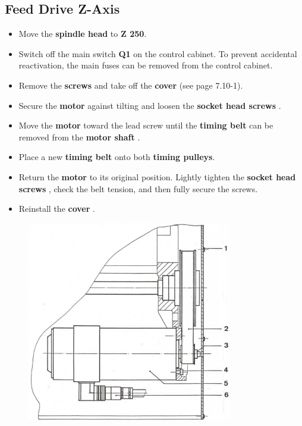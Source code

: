 
\newpage
\subsection*{Feed Drive Z-Axis}

\begin{itemize}
    \item Move the \textbf{spindle head} to \textbf{Z 250}.
    \item Switch off the main switch \textbf{Q1} on the control cabinet.  
          To prevent accidental reactivation, the main fuses can be removed from the control cabinet.
    \item Remove the \textbf{screws } and take off the \textbf{cover } (see page 7.10-1).
    \item Secure the \textbf{motor } against tilting and loosen the \textbf{socket head screws }.
    \item Move the \textbf{motor } toward the lead screw until the \textbf{timing belt } can be removed from the \textbf{motor shaft }.
    \item Place a new \textbf{timing belt } onto both \textbf{timing pulleys}.
    \item Return the \textbf{motor } to its original position. Lightly tighten the \textbf{socket head screws }, check the belt tension, and then fully secure the screws.
    \item Reinstall the \textbf{cover }.
\end{itemize}

\begin{figure}[H]
    \centering
    \includegraphics[width=0.8\textwidth]{images/chapter7/timing_belt_replacement_z_axis.jpg}
    \label{fig:timing_belt_replacement_z_axis}
\end{figure}

